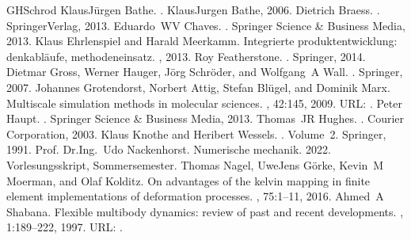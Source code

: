 \documentclass[letterpaper,10pt,german]{jupyterBook}
\begin{document}
\begin{sphinxthebibliography}{GHSchrod}
\sphinxAtStartPar
Klaus\sphinxhyphen{}Jürgen Bathe. . Klaus\sphinxhyphen{}Jurgen Bathe, 2006.
\sphinxAtStartPar
Dietrich Braess. . Springer\sphinxhyphen{}Verlag, 2013.
\sphinxAtStartPar
Eduardo WV Chaves. . Springer Science \& Business Media, 2013.
\sphinxAtStartPar
Klaus Ehrlenspiel and Harald Meerkamm. Integrierte produktentwicklung: denkabläufe, methodeneinsatz. , 2013.
\sphinxAtStartPar
Roy Featherstone. . Springer, 2014.
\sphinxAtStartPar
Dietmar Gross, Werner Hauger, Jörg Schröder, and Wolfgang A Wall. . Springer, 2007.
\sphinxAtStartPar
Johannes Grotendorst, Norbert Attig, Stefan Blügel, and Dominik Marx. Multiscale simulation methods in molecular sciences. , 42:145, 2009. URL: .
\sphinxAtStartPar
Peter Haupt. . Springer Science \& Business Media, 2013.
\sphinxAtStartPar
Thomas JR Hughes. . Courier Corporation, 2003.
\sphinxAtStartPar
Klaus Knothe and Heribert Wessels. . Volume 2. Springer, 1991.
\sphinxAtStartPar
Prof. Dr.\sphinxhyphen{}Ing. Udo Nackenhorst. Numerische mechanik. 2022. Vorlesungsskript, Sommersemester.
\sphinxAtStartPar
Thomas Nagel, Uwe\sphinxhyphen{}Jens Görke, Kevin M Moerman, and Olaf Kolditz. On advantages of the kelvin mapping in finite element implementations of deformation processes. , 75:1–11, 2016.
\sphinxAtStartPar
Ahmed A Shabana. Flexible multibody dynamics: review of past and recent developments. , 1:189–222, 1997. URL: .

\end{sphinxthebibliography}
\end{document}
